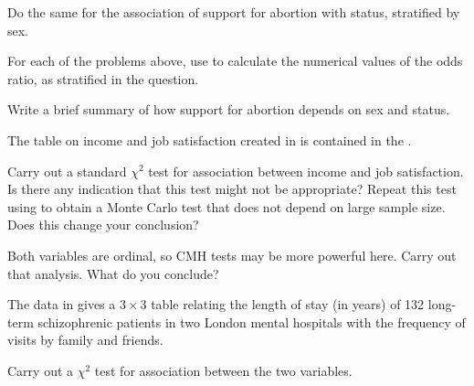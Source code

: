 \documentclass[10pt]{report}\usepackage[]{graphicx}\usepackage[]{color}
\begin{document}
\begin{Exercises}
\begin{enumerate*}
    \item Do the same for the association of support for abortion with status, stratified
    by sex.
    \begin{ans}
    \end{ans}
    
    \item For each of the problems above, use  to calculate the numerical
    values of the odds ratio, as stratified in the question.
    \begin{ans}
    \end{ans}
    
    \item Write a brief summary of how support for abortion depends on sex and status.
    \begin{ans}
    \end{ans}
    
  \end{enumerate*}

  \exercise The  table on income and job satisfaction
  created in  is contained in the
  .
  \begin{enumerate*}
    \item Carry out a standard $\chi^2$ test for association between income and job satisfaction.
    Is there any indication that this test might not be appropriate?
      Repeat this test using  to obtain a Monte Carlo
      test that does not depend on large sample size.  Does this change your
      conclusion?
    \begin{ans}
    \end{ans}
    
    \item Both variables are ordinal, so CMH tests may be more powerful here.
    Carry out that analysis.  What do you conclude?
    \begin{ans}
    \end{ans}
    
  \end{enumerate*}

  \exercise The  data in  gives a $3 \times 3$ table
  relating the length of stay (in years) of 132 long-term schizophrenic patients in two London mental hospitals with the frequency of visits
  by family and friends.
    \begin{enumerate*}
      \item Carry out a  $\chi^2$ test for association between the two
      variables.
      \begin{ans}
      \end{ans}
      

\end{enumerate*}
\end{Exercises}
\end{document}
